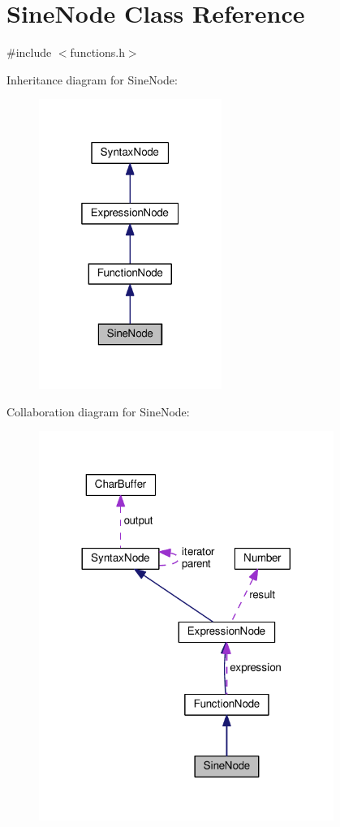 \hypertarget{classSineNode}{}\section{Sine\+Node Class Reference}
\label{classSineNode}


{\ttfamily \#include $<$functions.\+h$>$}



Inheritance diagram for Sine\+Node\+:\nopagebreak
\begin{figure}[H]
\begin{center}
\leavevmode
\includegraphics[width=169pt]{classSineNode__inherit__graph}
\end{center}
\end{figure}


Collaboration diagram for Sine\+Node\+:\nopagebreak
\begin{figure}[H]
\begin{center}
\leavevmode
\includegraphics[width=272pt]{classSineNode__coll__graph}
\end{center}
\end{figure}
